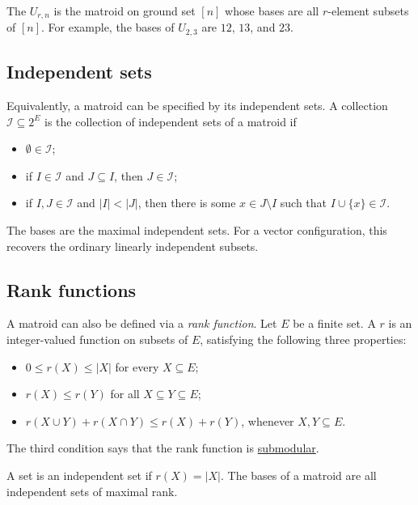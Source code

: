 \begin{example}\label{matroidUniform}
The \label{uniformMatroid} $U_{r,n}$ is the matroid on
ground set $[n]$ whose bases are all $r$-element subsets of $[n]$.  For
example, the bases of $U_{2,3}$ are $12$, $13$, and $23$.
\end{example}


\subsection[matroidIndependentSets]{Independent sets}

Equivalently, a matroid can be specified by its independent sets.  A collection
$\mathcal{I}\subseteq 2^E$ is the collection of independent sets of a matroid
if
\begin{itemize}
\item $\emptyset\in\mathcal{I}$;
\item if $I\in\mathcal{I}$ and $J\subseteq I$, then $J\in\mathcal{I}$;
\item if $I,J\in\mathcal{I}$ and $|I|<|J|$, then there is some
  $x\in J\setminus I$ such that $I\cup\{x\}\in\mathcal{I}$.
\end{itemize}
The bases are the maximal independent sets.  For a vector configuration, this
recovers the ordinary linearly independent subsets.



\subsection[matroidRank]{Rank functions}

A matroid can also be defined via a \emph{rank function}.
Let $E$ be a finite set.  A \label{rankFunction} $r$ is
an integer-valued function on subsets of $E$, satisfying the following three
properties:
\begin{itemize}
\item $0 \leq r(X) \leq |X|$ for every $X \subseteq E$;
\item $r(X) \leq r(Y)$ for all $X\subseteq Y \subseteq E$;
\item $r(X \cup Y) + r(X \cap Y) \leq r(X)+r(Y)$, whenever $X,Y \subseteq E$.
\end{itemize}
The third condition says that the rank function is
\hyperref[submodular]{submodular}.

A set is an independent set if $r(X)=|X|$.
The bases of a matroid are all independent sets of maximal rank.


